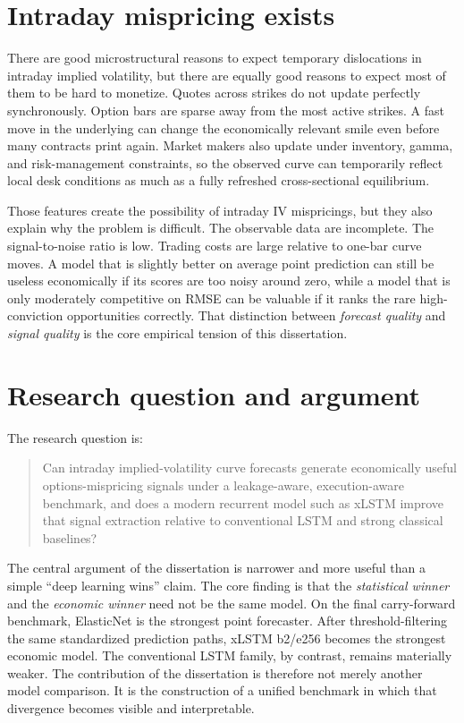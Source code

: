 \documentclass[12pt]{report}
\begin{document}
\section{Intraday mispricing exists}
There are good microstructural reasons to expect temporary dislocations in intraday implied volatility, but there are equally good reasons to expect most of them to be hard to monetize. Quotes across strikes do not update perfectly synchronously. Option bars are sparse away from the most active strikes. A fast move in the underlying can change the economically relevant smile even before many contracts print again. Market makers also update under inventory, gamma, and risk-management constraints, so the observed curve can temporarily reflect local desk conditions as much as a fully refreshed cross-sectional equilibrium.

Those features create the possibility of intraday IV mispricings, but they also explain why the problem is difficult. The observable data are incomplete. The signal-to-noise ratio is low. Trading costs are large relative to one-bar curve moves. A model that is slightly better on average point prediction can still be useless economically if its scores are too noisy around zero, while a model that is only moderately competitive on RMSE can be valuable if it ranks the rare high-conviction opportunities correctly. That distinction between \emph{forecast quality} and \emph{signal quality} is the core empirical tension of this dissertation.

\section{Research question and argument}
The research question is:

\begin{quote}
Can intraday implied-volatility curve forecasts generate economically useful options-mispricing signals under a leakage-aware, execution-aware benchmark, and does a modern recurrent model such as xLSTM improve that signal extraction relative to conventional LSTM and strong classical baselines?
\end{quote}

The central argument of the dissertation is narrower and more useful than a simple ``deep learning wins'' claim. The core finding is that the \emph{statistical winner} and the \emph{economic winner} need not be the same model. On the final carry-forward benchmark, ElasticNet is the strongest point forecaster. After threshold-filtering the same standardized prediction paths, xLSTM b2/e256 becomes the strongest economic model. The conventional LSTM family, by contrast, remains materially weaker. The contribution of the dissertation is therefore not merely another model comparison. It is the construction of a unified benchmark in which that divergence becomes visible and interpretable.
\end{document}

